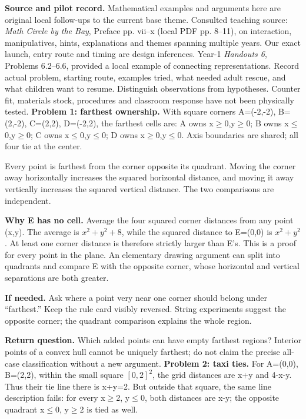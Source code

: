 \documentclass[11pt]{article}
\begin{document}
\textbf{Source and pilot record.} Mathematical examples and arguments here are original local follow-ups to the current base theme. Consulted teaching source: \emph{Math Circle by the Bay}, Preface pp. vii--x (local PDF pp. 8--11), on interaction, manipulatives, hints, explanations and themes spanning multiple years. Our exact launch, entry route and timing are design inferences. Year-1 \emph{Handouts 6}, Problems 6.2--6.6, provided a local example of connecting representations. Record actual problem, starting route, examples tried, what needed adult rescue, and what children want to resume. Distinguish observations from hypotheses. Counter fit, materials stock, procedures and classroom response have not been physically tested.
\newpage
\textbf{Problem 1: farthest ownership.} With square corners A=(-2,-2), B=(2,-2), C=(2,2), D=(-2,2), the farthest cells are: A owns x\(\geq\)0,y\(\geq\)0; B owns x\(\leq\)0,y\(\geq\)0; C owns x\(\leq\)0,y\(\leq\)0; D owns x\(\geq\)0,y\(\leq\)0. Axis boundaries are shared; all four tie at the center.

Every point is farthest from the corner opposite its quadrant. Moving the corner away horizontally increases the squared horizontal distance, and moving it away vertically increases the squared vertical distance. The two comparisons are independent.

\textbf{Why E has no cell.} Average the four squared corner distances from any point (x,y). The average is \(x^2+y^2+8\), while the squared distance to E=(0,0) is \(x^2+y^2\). At least one corner distance is therefore strictly larger than E's. This is a proof for every point in the plane. An elementary drawing argument can split into quadrants and compare E with the opposite corner, whose horizontal and vertical separations are both greater.

\textbf{If needed.} Ask where a point very near one corner should belong under ``farthest.'' Keep the rule card visibly reversed. String experiments suggest the opposite corner; the quadrant comparison explains the whole region.

\textbf{Return question.} Which added points can have empty farthest regions? Interior points of a convex hull cannot be uniquely farthest; do not claim the precise all-case classification without a new argument.
\newpage
\textbf{Problem 2: taxi ties.} For A=(0,0), B=(2,2), within the small square \([0,2]^2\), the grid distances are x+y and 4-x-y. Thus their tie line there is x+y=2. But outside that square, the same line description fails: for every x\(\geq\)2, y\(\leq\)0, both distances are x-y; the opposite quadrant x\(\leq\)0, y\(\geq\)2 is tied as well.
\end{document}

